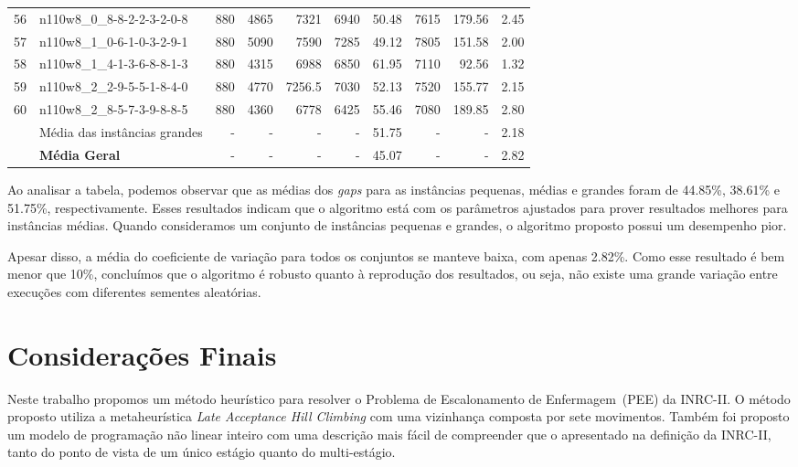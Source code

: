 \documentclass[cic,tc, twoside]{iiufrgs}
\begin{document}
\begin{table}[!]
{\begin{tabular}{rlrrrrrrrr}
56	&	n110w8\_0\_8-8-2-2-3-2-0-8	&	880	&	4865	&	7321	&	6940	&	50.48	&	7615	&	179.56	&	2.45	\\
57	&	n110w8\_1\_0-6-1-0-3-2-9-1	&	880	&	5090	&	7590	&	7285	&	49.12	&	7805	&	151.58	&	2.00	\\
58	&	n110w8\_1\_4-1-3-6-8-8-1-3	&	880	&	4315	&	6988	&	6850	&	61.95	&	7110	&	92.56	&	1.32	\\
59	&	n110w8\_2\_2-9-5-5-1-8-4-0	&	880	&	4770	&	7256.5	&	7030	&	52.13	&	7520	&	155.77	&	2.15	\\
60	&	n110w8\_2\_8-5-7-3-9-8-8-5	&	880	&	4360	&	6778	&	6425	&	55.46	&	7080	&	189.85	&	2.80	\\
\midrule		
    &   Média das instâncias grandes &    -  &   -       &   -       &   -       &	51.75   &   -       &   -       &   2.18  \\		
	 \midrule								
    & \textbf{Média Geral}          &   -   &  -        & -         &  -        & 45.07     &   -       &  -        &    2.82 \\ 
   \bottomrule
\end{tabular}
}
\end{table}

Ao analisar a tabela, podemos observar que as médias dos \emph{gaps} para as instâncias pequenas, médias e grandes foram de 44.85\%, 38.61\% e 51.75\%, respectivamente. Esses resultados indicam que o algoritmo está com os parâmetros ajustados para prover resultados melhores para instâncias médias. 
Quando consideramos um conjunto de instâncias pequenas e grandes, o algoritmo proposto possui um desempenho pior. 

Apesar disso, a média do coeficiente de variação para todos os conjuntos se manteve baixa, com apenas 2.82\%. Como esse resultado é bem menor que 10\%, concluímos que o algoritmo é robusto quanto à reprodução dos resultados, ou seja, não existe uma grande variação entre execuções com diferentes sementes aleatórias. 


\chapter{Considerações Finais} \label{ChapConc}

Neste trabalho propomos um método heurístico para resolver o Problema de Escalonamento de Enfermagem~(PEE) da INRC-II. O método proposto utiliza a metaheurística \textit{Late Acceptance Hill Climbing} com uma vizinhança composta por sete movimentos.
Também foi proposto um modelo de programação não linear inteiro com uma descrição mais fácil de compreender que o apresentado na definição da INRC-II, tanto do ponto de vista de um único estágio quanto do multi-estágio. 
\end{document}
